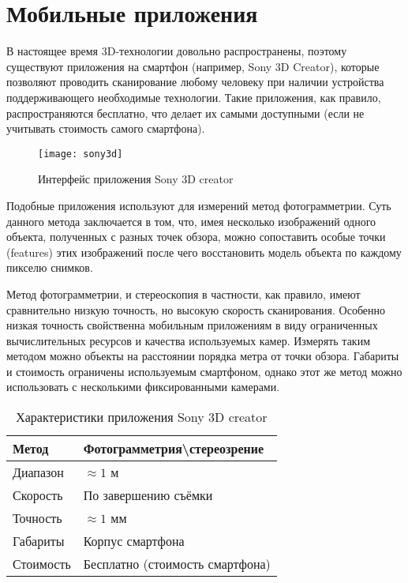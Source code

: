     \section{Мобильные приложения}
        В настоящее время 3D-технологии довольно распространены, поэтому существуют приложения на смартфон (например, Sony 3D Creator), которые позволяют проводить сканирование любому человеку при наличии устройства поддерживающего необходимые технологии. Такие приложения, как правило, распространяются бесплатно, что делает их самыми доступными (если не учитывать стоимость самого смартфона).

        \begin{figure}[H]
            \centering
            \texttt{[image: sony3d]}\label{pic:sony3d}
            \caption{Интерфейс приложения Sony 3D creator}
        \end{figure}

        Подобные приложения используют для измерений метод фотограмметрии. Суть данного метода заключается в том, что, имея несколько изображений одного объекта, полученных с разных точек обзора, можно сопоставить особые точки (features) этих изображений после чего восстановить модель объекта по каждому пикселю снимков\cite{Guzhov}.

        Метод фотограмметрии, и стереоскопия в частности, как правило, имеют сравнительно низкую точность, но высокую скорость сканирования. Особенно низкая точность свойственна мобильным приложениям в виду ограниченных вычислительных ресурсов и качества используемых камер. Измерять таким методом можно объекты на расстоянии порядка метра от точки обзора. Габариты и стоимость ограничены используемым смартфоном, однако этот же метод можно использовать с несколькими фиксированными камерами.

        \begin{table}[H]
            \centering
            \caption{Характеристики приложения Sony 3D creator}\label{table:sony3d}
            \begin{tabular}{|l|l|}\hline
                Метод&Фотограмметрия\textbackslash{}стереозрение\\ \hline
                Диапазон&$\approx 1$ м\\ \hline
                Скорость&По завершению съёмки\\ \hline
                Точность&$\approx 1$ мм\\ \hline
                Габариты&Корпус смартфона\\ \hline
                Стоимость&Бесплатно (стоимость смартфона)\\ \hline
            \end{tabular}
        \end{table}

